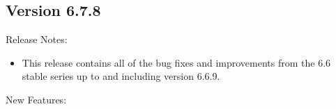 \subsection*{\label{sec:New-6-7-8}Version 6.7.8}

\noindent Release Notes:

\begin{itemize}

\item This release contains all of the bug fixes and improvements from
  the 6.6 stable series up to and including version 6.6.9.

\end{itemize}

\noindent New Features:

